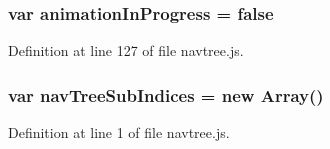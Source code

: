 \subsubsection[{animation\+In\+Progress}]{\setlength{\rightskip}{0pt plus 5cm}var animation\+In\+Progress = false}\label{navtree_8js_a588cb5a5004d817923eb3f45c8f0f7c7}


Definition at line 127 of file navtree.\+js.

\subsubsection[{nav\+Tree\+Sub\+Indices}]{\setlength{\rightskip}{0pt plus 5cm}var nav\+Tree\+Sub\+Indices = new Array()}\label{navtree_8js_aee39e0d4ab2646ada03125bd7e750cf7}


Definition at line 1 of file navtree.\+js.

